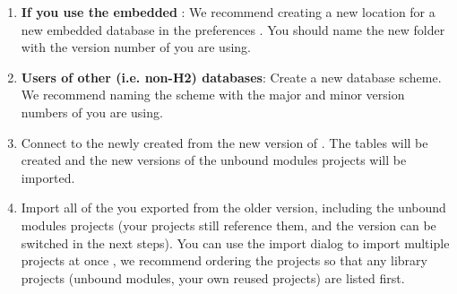\begin{enumerate}
\item \textbf{If you use the embedded \gddb{}}: We recommend creating a new location for a new embedded database in the preferences . You should name the new folder with the version number of \app{} you are using. 
\item \textbf{Users of other (i.e. non-H2) databases}: Create a new database scheme. We recommend naming the scheme with the major and minor version numbers of \app{} you are using. 
\item Connect to the newly created \gddb{} from the new version of \app{}. The \gddb{} tables will be created and the new versions of the unbound modules projects will be imported.  
\item Import all of the \gdprojects{} you exported from the older version, including the unbound modules projects (your projects still reference them, and the version can be switched in the next steps). You can use the import dialog to import multiple projects at once , we recommend ordering the projects so that any library projects (unbound modules, your own reused projects) are listed first.
\end{enumerate}
